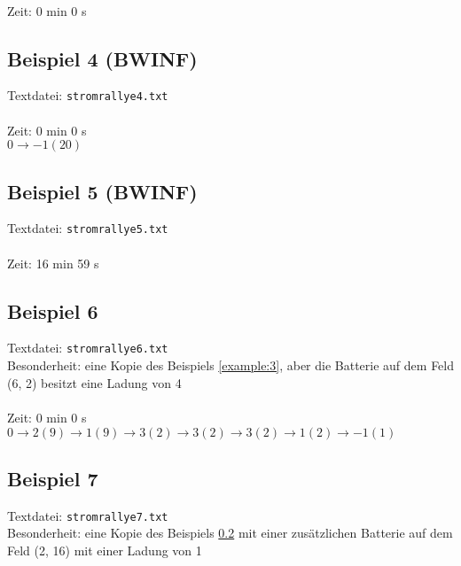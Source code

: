\documentclass[a4paper,10pt,ngerman]{scrartcl}
\begin{document}
\noindent
{}\\

\noindent
Zeit: 0 min 0 s

\subsection{Beispiel 4 (BWINF)}\label{example:4}
Textdatei: \texttt{stromrallye4.txt}\\

\noindent
{}\\

\noindent
Zeit: 0 min 0 s\\

\noindent
$0 \rightarrow -1(20)$

\subsection{Beispiel 5 (BWINF)}\label{example:5}
Textdatei: \texttt{stromrallye5.txt}\\

\noindent
{}\\

\noindent
Zeit: 16 min 59 s

\subsection{Beispiel 6}\label{example:6}
Textdatei: \texttt{stromrallye6.txt}\\
Besonderheit: eine Kopie des Beispiels \ref{example:3}, aber die Batterie auf dem Feld (6, 2) besitzt eine Ladung von 4\\

\noindent
{}\\

\noindent
Zeit: 0 min 0 s\\

\noindent
$0 \rightarrow2(9) \rightarrow 1(9) \rightarrow 3(2) \rightarrow 3(2) \rightarrow 3(2) \rightarrow 1(2) \rightarrow -1(1)$

\noindent
\subsection{Beispiel 7}\label{example:7}
Textdatei: \texttt{stromrallye7.txt}\\
Besonderheit: eine Kopie des Beispiels \ref{example:5} mit einer zusätzlichen Batterie auf dem Feld (2, 16) mit einer Ladung von 1\\
\end{document}
